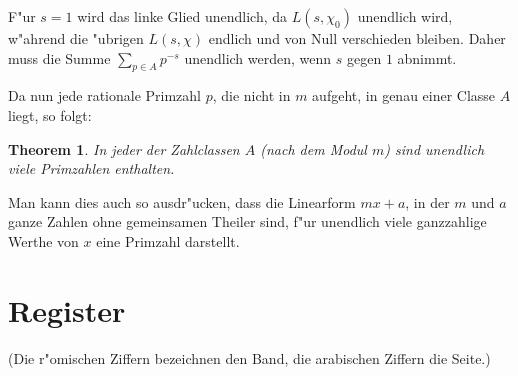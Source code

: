 \documentclass[10pt,a4paper]{article}
\theoremstyle{weberstyle}
\newtheorem{theorem}{Theorem}[section]
\begin{document}
F"ur $s=1$ wird das linke Glied unendlich, da $L(s,\chi_0)$ unendlich
wird, w"ahrend die "ubrigen $L(s,\chi)$ endlich und von Null verschieden
bleiben. Daher muss die Summe $\sum_{p\in A}p^{-s}$ unendlich werden, wenn
$s$ gegen $1$ abnimmt.

Da nun jede rationale Primzahl $p$, die nicht in $m$ aufgeht, in genau
einer Classe $A$ liegt, so folgt:

\begin{theorem}
In jeder der Zahlclassen $A$ (nach dem Modul $m$) sind unendlich viele
Primzahlen enthalten.
\end{theorem}

Man kann dies auch so ausdr"ucken, dass die Linearform $mx+a$, in der
$m$ und $a$ ganze Zahlen ohne gemeinsamen Theiler sind, f"ur unendlich
viele ganzzahlige Werthe von $x$ eine Primzahl darstellt.

\newpage

%
%
\part*{Register}

(Die r"omischen Ziffern bezeichnen den Band, die arabischen Ziffern die
Seite.)
\end{document}
